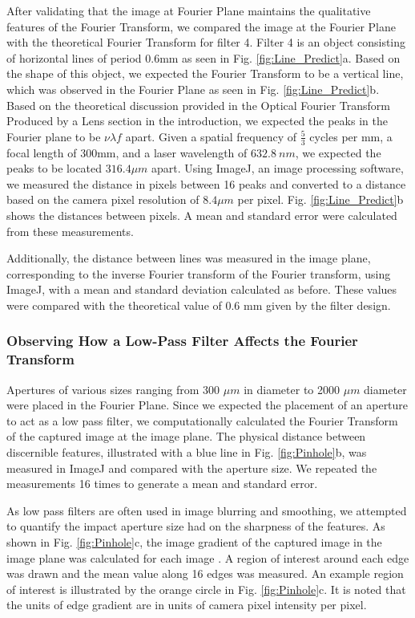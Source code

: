 \documentclass[twocolumn,amsmath,amssymb,pra]{revtex4-2}
\begin{document}
After validating that the image at Fourier Plane maintains the qualitative features of the Fourier Transform, we compared the image at the Fourier Plane with the theoretical Fourier Transform for filter 4. Filter 4 is an object consisting of horizontal lines of period 0.6mm as seen in Fig. \ref{fig:Line_Predict}a. Based on the shape of this object, we expected the Fourier Transform to be a vertical line, which was observed in the Fourier Plane as seen in Fig. \ref{fig:Line_Predict}b. Based on the theoretical discussion provided in the Optical Fourier Transform Produced by a Lens section in the introduction, we expected the peaks in the Fourier plane to be $\nu \lambda f$ apart. Given a spatial frequency of $\frac{5}{3}$ cycles per mm, a focal length of 300mm, and a laser wavelength of $632.8 \ \si{nm}$, we expected the peaks to be located $316.4 \mu m$ apart. Using ImageJ, an image processing software, we measured the distance in pixels between 16 peaks and converted to a distance based on the camera pixel resolution of $8.4\mu m$ per pixel. Fig. \ref{fig:Line_Predict}b shows the distances between pixels. A mean and standard error were calculated from these measurements. 

Additionally, the distance between lines was measured in the image plane, corresponding to the inverse Fourier transform of the Fourier transform, using ImageJ, with a mean and standard deviation calculated as before. These values were compared with the theoretical value of 0.6 mm given by the filter design. 

\subsubsection{Observing How a Low-Pass Filter Affects the Fourier Transform}
Apertures of various sizes ranging from 300 $\mu m$ in diameter to 2000 $\mu m$ diameter were placed in the Fourier Plane. Since we expected the placement of an aperture to act as a low pass filter, we computationally calculated the Fourier Transform of the captured image at the image plane. The physical distance between discernible features, illustrated with a blue line in Fig. \ref{fig:Pinhole}b, was measured in ImageJ and compared with the aperture size. We repeated the measurements 16 times to generate a mean and standard error. 

As low pass filters are often used in image blurring and smoothing, we attempted to quantify the impact aperture size had on the sharpness of the features. As shown in Fig. \ref{fig:Pinhole}c, the image gradient of the captured image in the image plane was calculated for each image \cite{feichtenhofer2013perceptual}. A region of interest around each edge was drawn and the mean value along 16 edges was measured. An example region of interest is illustrated by the orange circle in Fig. \ref{fig:Pinhole}c. It is noted that the units of edge gradient are in units of camera pixel intensity per pixel.
\end{document}
